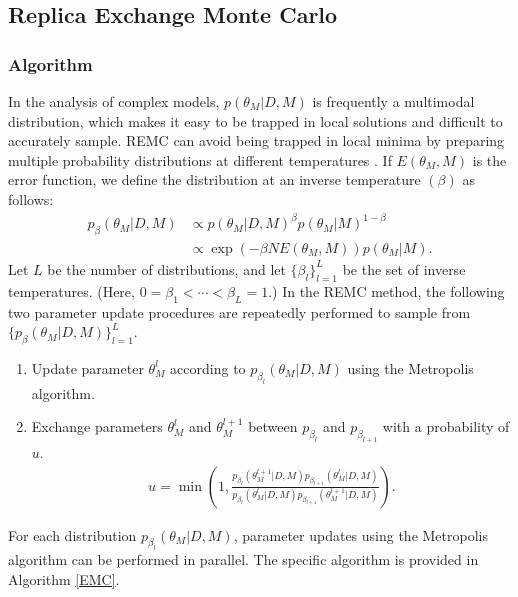 \documentclass[12pt]{article}
\begin{document}
\subsection{Replica Exchange Monte Carlo}
\subsubsection{Algorithm}
In the analysis of complex models, $p(\theta_M|D, M)$ is frequently a multimodal distribution, which makes it easy to be trapped in local solutions and difficult to accurately sample.
REMC can avoid being trapped in local minima by preparing multiple probability distributions at different temperatures \cite{Hukushima1996}.
If $E(\theta_M, M)$ is the error function, we define the distribution at an inverse temperature $(\beta)$ as follows:
\begin{align}
  \label{eq:temperature}
  p_\beta(\theta_M|D, M) &\propto p(\theta_M|D,M)^{\beta}p(\theta_M|M)^{1-\beta} \\
  &\propto  \exp(-\beta N E(\theta_M, M))p(\theta_M|M).
\end{align}
Let $L$ be the number of distributions, and let $\{\beta_l\}_{l=1}^L$ be the set of inverse temperatures. (Here, $0 = \beta_1 < \cdots < \beta_L = 1$.)
In the REMC method, the following two parameter update procedures are repeatedly performed to sample from $\{p_\beta(\theta_M|D, M)\}_{l = 1}^L$.
\begin{enumerate}
  \item Update parameter $\theta_M^l$ according to $p_{\beta_l}(\theta_M|D, M)$ using the Metropolis algorithm.
  \item Exchange parameters $\theta_M^l$ and $\theta_M^{l+1}$ between $p_{\beta_{l}}$ and $p_{\beta_{l+1}}$ with a probability of $u$.
  \begin{align}
    u = \min\left(1, \frac{p_{\beta_{l}}(\theta_M^{l+1}|D,M)p_{\beta_{l+1}}(\theta_M^{l}|D,M)}{p_{\beta_{l}}(\theta_M^{l}|D,M)p_{\beta_{l+1}}(\theta_M^{l+1}|D,M)}\right).
  \end{align}
\end{enumerate}
For each distribution $p_{\beta_l}(\theta_M|D, M)$, parameter updates using the Metropolis algorithm can be performed in parallel.
The specific algorithm is provided in Algorithm \ref{EMC}. \par
\end{document}
